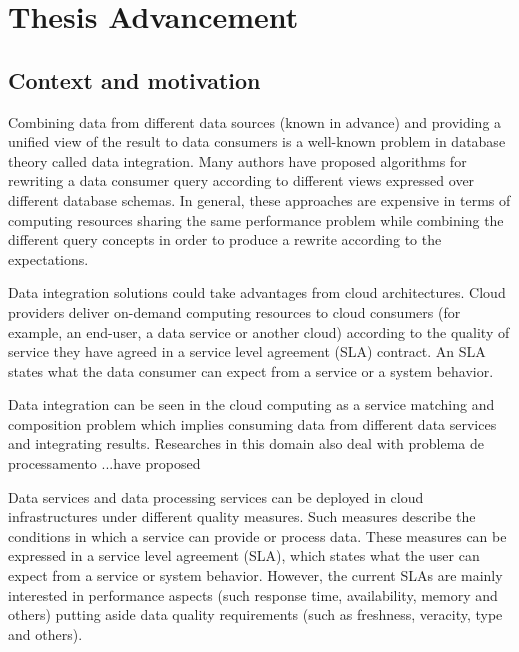 \chapter{Thesis Advancement}
\label{chap:context}
\minitoc

\section{Context and motivation}
%
Combining data from different data sources (known in advance) and providing 
a unified view of the result to data consumers is a well-known problem in 
database theory called data integration. 
%
Many authors have proposed algorithms for rewriting a data consumer query
according to different views expressed over different database schemas.
%
In general, these approaches are expensive in terms of computing resources
sharing the 
same performance problem while combining the different query concepts 
in order to produce a rewrite according to the expectations. 

Data integration solutions could take advantages from cloud architectures.
%
Cloud providers deliver on-demand computing resources to cloud consumers
(for example, an end-user, a data service or another cloud)
according to the quality of service they have agreed in a service level 
agreement (SLA) contract. 
%
An SLA states what the data consumer can expect from a service or a system
behavior.

Data integration can be seen in the cloud computing as a service matching 
and composition problem which implies consuming data from different data 
services and integrating results. 
%
Researches in this domain also deal with problema de processamento ...have proposed 

\bigskip
Data services and data processing services can be deployed in cloud infrastructures under different quality measures. Such measures describe the conditions in which a service can provide or process data. These measures can be expressed in a service level agreement (SLA), which states what the user can expect from a service or system behavior.
However, the current SLAs are mainly interested in performance aspects (such response time, availability, memory and others) putting aside data quality requirements (such as freshness, veracity, type and others).


